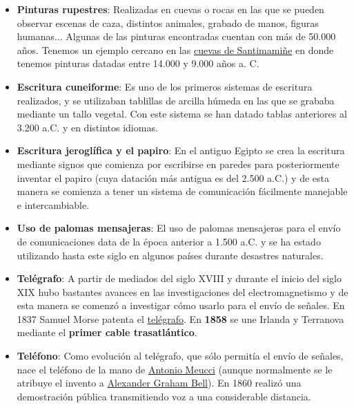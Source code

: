 \begin{itemize}
    \item \textbf{Pinturas rupestres}: Realizadas en cuevas o rocas en las que se pueden observar escenas de caza, distintos animales, grabado de manos, figuras humanas... Algunas de las pinturas encontradas cuentan con más de 50.000 años. Tenemos un ejemplo cercano en las \href{https://es.wikipedia.org/wiki/Cueva_de_Santimami\%C3\%B1e}{cuevas de Santimamiñe} en donde tenemos pinturas datadas entre 14.000 y 9.000 años a. C.

    \item \textbf{Escritura cuneiforme}: Es uno de los primeros sistemas de escritura realizados, y se utilizaban tablillas de arcilla húmeda en las que se grababa mediante un tallo vegetal. Con este sistema se han datado tablas anteriores al 3.200 a.C. y en distintos idiomas.

    \item \textbf{Escritura jeroglífica y el papiro}: En el antiguo Egipto se crea la escritura mediante signos que comienza por escribirse en paredes para posteriormente inventar el papiro (cuya datación más antigua es del 2.500 a.C.) y de esta manera se comienza a tener un sistema de comunicación fácilmente manejable e intercambiable.

    \item \textbf{Uso de palomas mensajeras}: El uso de palomas mensajeras para el envío de comunicaciones data de la época anterior a 1.500 a.C. y se ha estado utilizando hasta este siglo en algunos países durante desastres naturales.

    \item \textbf{Telégrafo}: A partir de mediados del siglo XVIII y durante el inicio del siglo XIX hubo bastantes avances en las investigaciones del electromagnetismo y de esta manera se comenzó a investigar cómo usarlo para el envío de señales. En 1837 Samuel Morse patenta el \href{https://es.wikipedia.org/wiki/Tel%C3%A9grafo#Historia_del_tel%C3%A9grafo}{telégrafo}. En \textbf{1858} se une Irlanda y Terranova mediante el \textbf{primer cable trasatlántico}.

    \item \textbf{Teléfono}: Como evolución al telégrafo, que sólo permitía el envío de señales, nace el teléfono de la mano de \href{https://es.wikipedia.org/wiki/Antonio_Meucci}{Antonio Meucci} (aunque normalmente se le atribuye el invento a \href{https://es.wikipedia.org/wiki/Alexander_Graham_Bell}{Alexander Graham Bell}). En 1860 realizó una demostración pública transmitiendo voz a una considerable distancia.
\end{itemize}

